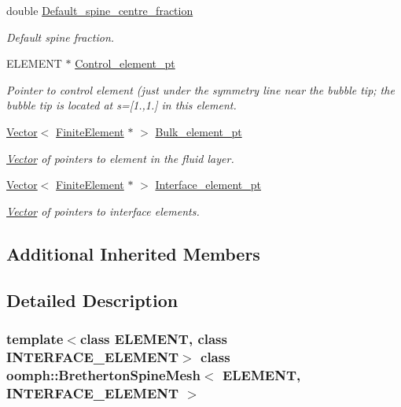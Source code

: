 \begin{DoxyCompactItemize}
double \hyperlink{classoomph_1_1BrethertonSpineMesh_a306cf8ae8f91a81054904de64195bb16}{Default\+\_\+spine\+\_\+centre\+\_\+fraction}
\begin{DoxyCompactList}\small\item\em Default spine fraction. \end{DoxyCompactList}\item 
E\+L\+E\+M\+E\+NT $\ast$ \hyperlink{classoomph_1_1BrethertonSpineMesh_a81ee86c0c747947dab52073c221d53c1}{Control\+\_\+element\+\_\+pt}
\begin{DoxyCompactList}\small\item\em Pointer to control element (just under the symmetry line near the bubble tip; the bubble tip is located at s=\mbox{[}1.,1.\mbox{]} in this element. \end{DoxyCompactList}\item 
\hyperlink{classoomph_1_1Vector}{Vector}$<$ \hyperlink{classoomph_1_1FiniteElement}{Finite\+Element} $\ast$ $>$ \hyperlink{classoomph_1_1BrethertonSpineMesh_aeb4fa323886ed601b1497777f8e686bc}{Bulk\+\_\+element\+\_\+pt}
\begin{DoxyCompactList}\small\item\em \hyperlink{classoomph_1_1Vector}{Vector} of pointers to element in the fluid layer. \end{DoxyCompactList}\item 
\hyperlink{classoomph_1_1Vector}{Vector}$<$ \hyperlink{classoomph_1_1FiniteElement}{Finite\+Element} $\ast$ $>$ \hyperlink{classoomph_1_1BrethertonSpineMesh_a204c551bf8ac1a3a4ca4cd31c0db9c56}{Interface\+\_\+element\+\_\+pt}
\begin{DoxyCompactList}\small\item\em \hyperlink{classoomph_1_1Vector}{Vector} of pointers to interface elements. \end{DoxyCompactList}\end{DoxyCompactItemize}
\subsection*{Additional Inherited Members}


\subsection{Detailed Description}
\subsubsection*{template$<$class E\+L\+E\+M\+E\+NT, class I\+N\+T\+E\+R\+F\+A\+C\+E\+\_\+\+E\+L\+E\+M\+E\+NT$>$\newline
class oomph\+::\+Bretherton\+Spine\+Mesh$<$ E\+L\+E\+M\+E\+N\+T, I\+N\+T\+E\+R\+F\+A\+C\+E\+\_\+\+E\+L\+E\+M\+E\+N\+T $>$}

